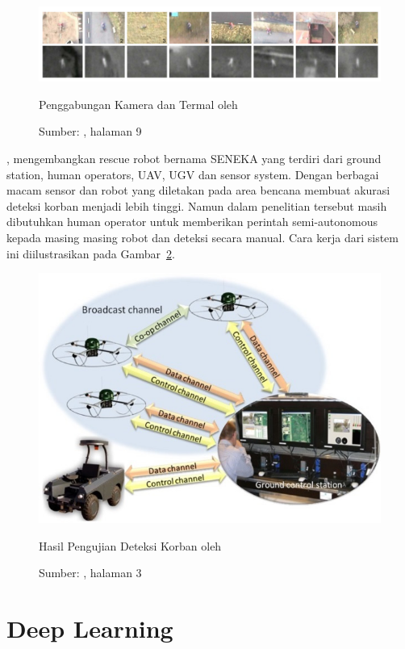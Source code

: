 \begin{figure}[ht]
 \includegraphics[width=\textwidth]{doherty}
 \caption{Penggabungan Kamera dan Termal oleh \cite{doherty2007uav}}
  \caption*{Sumber: \citet{doherty2007uav}, halaman 9}
 \label{fig:doherty}   
\end{figure}

\citet{kuntze2014situation}, mengembangkan rescue robot bernama SENEKA yang terdiri dari ground station, human operators, UAV, UGV dan sensor system. Dengan berbagai macam sensor dan robot yang diletakan pada area bencana membuat akurasi deteksi korban menjadi lebih tinggi. Namun dalam penelitian tersebut masih dibutuhkan human operator untuk memberikan perintah semi-autonomous kepada masing masing robot dan deteksi secara manual. Cara kerja dari sistem ini diilustrasikan pada Gambar~\ref{fig:kuntze}.

\begin{figure}[ht]
 \includegraphics[width=\textwidth/2]{kuntze}
 \caption{Hasil Pengujian Deteksi Korban oleh \cite{kuntze2014situation}}
  \caption*{Sumber: \citet{kuntze2014situation}, halaman 3}
 \label{fig:kuntze}   
\end{figure}

\section{Deep Learning}
